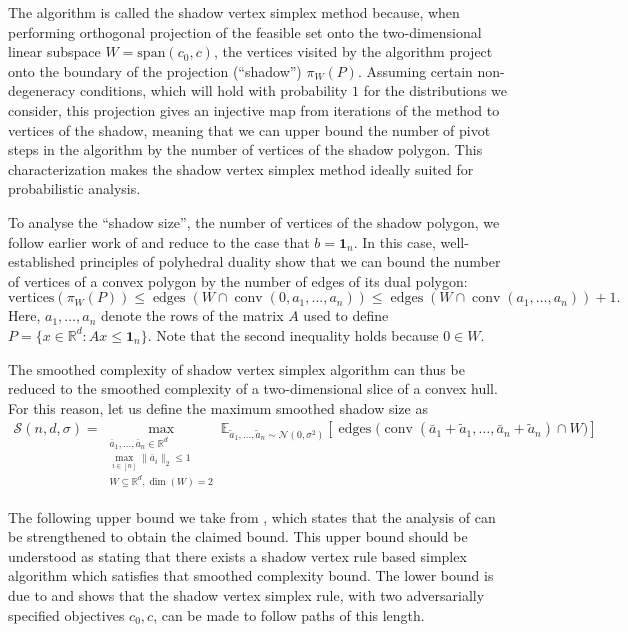\documentclass{theoretics}
\newcommand{\R}{\mathbb R}
\newcommand{\E}{\mathbb E}
\newcommand{\conv}{\operatorname{conv}}
\newcommand{\edges}{\operatorname{edges}}
\renewcommand{\subset}{\subseteq}
\begin{document}
The algorithm is called the shadow vertex simplex method because, when performing orthogonal
projection of the feasible set onto the two-dimensional linear subspace $W = \mathrm{span}(c_0, c)$, the
vertices visited by the algorithm project onto the boundary of the projection (``shadow'')
$\pi_W(P)$. Assuming certain non-degeneracy conditions, which will hold with probability $1$ for the distributions
we consider, this projection gives an injective map from iterations of the
method to vertices of the shadow, meaning that we can
upper bound the number of pivot steps in the algorithm by the number of
vertices of the shadow polygon. 
This characterization makes the shadow vertex simplex method ideally suited for
probabilistic analysis.

To analyse the ``shadow size'', the number of vertices of the shadow polygon,
we follow earlier work of \cite{ver09} and reduce to the case that $b=\mathbf 1_n$.
In this case, well-established principles of polyhedral duality show that
we can bound the number of vertices of a convex polygon by the number of edges of its dual polygon:
\[
    \text{vertices}(\pi_W(P)) \leq \edges(W \cap \conv(0,a_1,\dots,a_n)) \leq \edges(W \cap \conv(a_1,\dots,a_n))+1.
\]
Here, $a_1,\dots,a_n$ denote the rows of the matrix $A$ used to define
$P = \{x \in \R^d : Ax \leq \mathbf 1_n\}$.
Note that the second inequality holds because $0 \in W$.

The smoothed complexity of shadow vertex simplex algorithm can thus be reduced to the
smoothed complexity of a two-dimensional slice of a convex hull.
For this reason, let us define the maximum smoothed shadow size as
\begin{align}\label{eq:def-shadow-bound}
    \mathcal{S}(n, d,\sigma) = \max_{\substack{\bar{a}_1, \ldots, \bar{a}_n \in \R^d \\ \max_{i \in [n]} \|\bar{a}_i\|_2 \leq 1 \\ W \subset \R^d, \dim(W) = 2}} \E_{\tilde{a}_1, \ldots, \tilde{a}_n \sim \mathcal{N}(0,\sigma^2)} \left[ \edges\big( \conv(\bar{a}_1 + \tilde{a}_1, \ldots, \bar{a}_n + \tilde{a}_n) \cap W\big)\right]
\end{align}


The following upper bound we take from \cite{DH18}, which states that the analysis of \cite{ver09}
can be strengthened to obtain the claimed bound. This upper bound should be understood
as stating that there exists a shadow vertex rule based simplex algorithm which
satisfies that smoothed complexity bound.
The lower bound is due to \cite{b87} and shows that the shadow vertex simplex rule, with
two adversarially specified objectives $c_0, c$,
can be made to follow paths of this length.
\end{document}
